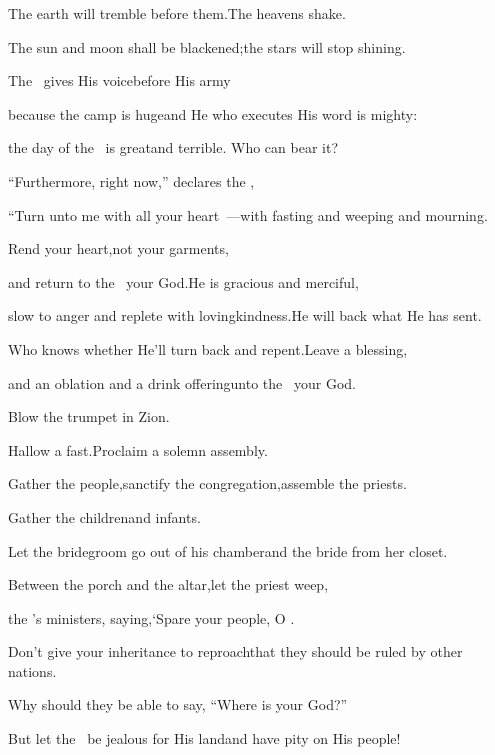 \begin{inparaenum}
  \pa{} The earth will tremble before them.\pa{}The heavens shake.%

  \pb{}The sun and moon shall be blackened;\pa{}the stars will stop shining.

  \pa{} The \lord\ gives His voice\pa{}before His army%

  \pb{}because the camp is huge\pa{}and He who executes His word is mighty:%

  \pb{}the day of the \lord\ is great\pa{}and terrible. Who can bear it?%

  \pb{} ``Furthermore, right now,'' declares the \lord,%

  \pc{}``Turn unto me with all your heart~---\pa{}with fasting and weeping and mourning.

  \pb{} Rend your heart,\pa{}not your garments,%

  \pc{}and return to the \lord\ your God.\ed{\S}\pa{}He is gracious and merciful,%

  \pc{}slow to anger and replete with lovingkindness.\pa{}He will back what He has sent.%

  \pb{} Who knows whether He'll turn back and repent.\pa{}Leave a blessing,%

  \pc{}and an oblation and a drink offering\pa{}unto the \lord\ your God.%

  \medskip\pa{} Blow the trumpet in Zion.%

  \pb{}Hallow a fast.\pa{}Proclaim a solemn assembly.%

  \pa{} Gather the people,\pa{}sanctify the congregation,\pa{}assemble the priests.%

  \pb{}Gather the children\pa{}and infants.%

  \pb{}Let the bridegroom go out of his chamber\pa{}and the bride from her closet.%

  \pa{} Between the porch and the altar,\pa{}let the priest weep,%

  \pb{}the \lord's ministers, saying,\pa{}`Spare your people, O \lord.%

  \pb{}Don't give your inheritance to reproach\pa{}that they should be ruled by other nations.%

  \pb{}Why should they be able to say, ``Where is your God?''%

  \pa{} But let the \lord\ be jealous for His land\pa{}and have pity on His people!%

  \pa{} %
  \pa{} %
  \pb{} %
  \pb{} %
  \pb{} %
  \pb{} %
  \pa{} %
  \pa{} %
  \pa{} %
\end{inparaenum}
